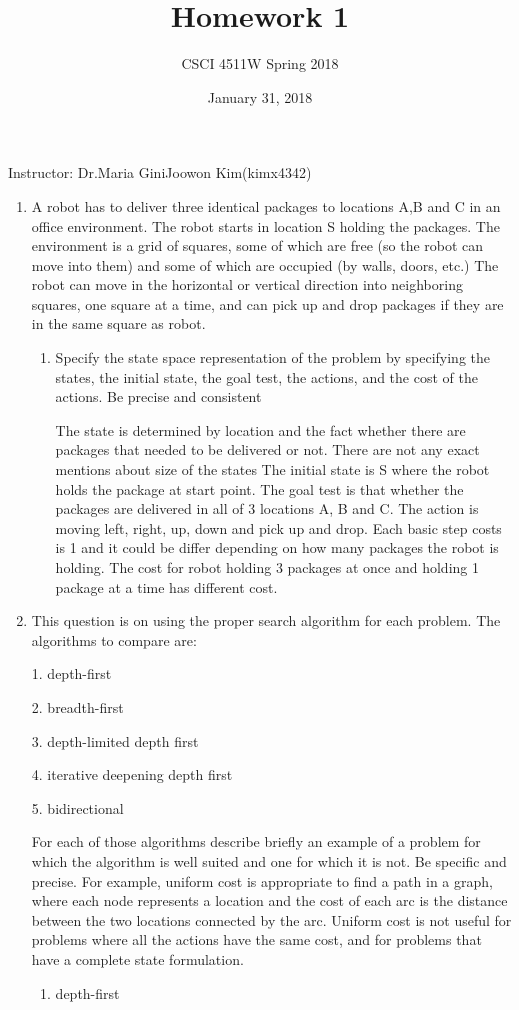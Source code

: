 \documentclass[12pt]{article}
\title{Homework 1}
\author{CSCI 4511W Spring 2018}
\begin{document}
\date{January 31, 2018}
\maketitle

Instructor: Dr.Maria Gini\hfill Joowon Kim(kimx4342)

\hrulefill

\begin{enumerate}
\item A robot has to deliver three identical packages to locations A,B and C in an office environment. The robot starts in location S holding the packages. The environment is a grid of squares, some of which are free (so the robot can move into them) and some of which are occupied (by walls, doors, etc.) The robot can move in the horizontal or vertical direction into neighboring squares, one square at a time, and can pick up and drop packages if they are in the same square as robot.
  \begin{enumerate}
  \item Specify the state space representation of the problem by specifying the states, the initial state, the goal test, the actions, and the cost of the actions. Be precise and consistent

  The state is determined by location and the fact whether there are packages that needed to be delivered or not. There are not any exact mentions about size of the states
  The initial state is S where the robot holds the package at start point. The goal test is that whether the packages are delivered in all of 3 locations A, B and C. The action is moving left, right, up, down and pick up and drop. Each basic step costs is 1 and it could be differ depending on how many packages the robot is holding. The cost for robot holding 3 packages at once and holding 1 package at a time has different cost.

  \end{enumerate}

\item This question is on using the proper search algorithm for each problem. The algorithms to compare are: \par
1. depth-first \par
2. breadth-first \par
3. depth-limited depth first \par
4. iterative deepening depth first \par
5. bidirectional \par
For each of those algorithms describe briefly an example of a problem for which the algorithm is well suited and one for which it is not. Be specific and precise. For example, uniform cost is appropriate to find a path in a graph, where each node represents a location and the cost of each arc is the distance between the two locations connected by the arc. Uniform cost is not useful for problems where all the actions have the same cost, and for problems that have a complete state formulation.
  \begin{enumerate}
  \item depth-first
  

\end{enumerate}
\end{enumerate}
\end{document}
